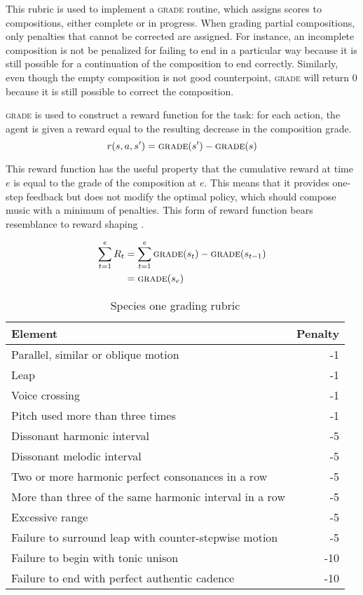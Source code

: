 \documentclass{article}
\begin{document}
    This rubric is used to implement a \textsc{grade} routine, which assigns scores to compositions, either complete or in progress. When grading partial compositions, only penalties that cannot be corrected are assigned. For instance, an incomplete composition is not be penalized for failing to end in a particular way because it is still possible for a continuation of the composition to end correctly. Similarly, even though the empty composition is not good counterpoint, \textsc{grade} will return 0 because it is still possible to correct the composition.
    
    \textsc{grade} is used to construct a reward function for the task: for each action, the agent is given a reward equal to the resulting decrease in the composition grade. 
    \begin{equation}
    r(s,a,s') = \textsc{grade}(s') - \textsc{grade}(s)
    \end{equation}
    
    This reward function has the useful property that the cumulative reward at time $e$ is equal to the grade of the composition at $e$. This means that it provides one-step feedback but does not modify the optimal policy, which should compose music with a minimum of penalties. This form of reward function bears resemblance to reward shaping \cite{Li2011}.
    
    \begin{align*}
    \sum_{t=1}^{e} R_t &= \sum_{t=1}^{e} \textsc{grade}(s_t) - \textsc{grade}(s_{t-1})\\
    &= \textsc{grade}(s_e)
    \end{align*}
    \begin{table}
        \begin{tabular}{p{6cm}r}
            \toprule
            Element & Penalty\\
            \midrule
            Parallel, similar or oblique motion & -1\\
            Leap & -1\\
            Voice crossing & -1\\
            Pitch used more than three times & -1\\
            Dissonant harmonic interval & -5\\
            Dissonant melodic interval & -5\\
            Two or more harmonic perfect consonances in a row & -5\\
            More than three of the same harmonic interval in a row & -5\\
            Excessive range & -5\\
            Failure to surround leap with counter-stepwise motion& -5\\
            Failure to begin with tonic unison & -10\\
            Failure to end with perfect authentic cadence & -10\\
            
            
            \bottomrule
        \end{tabular}
        \caption{Species one grading rubric}
    \end{table}
\end{document}
